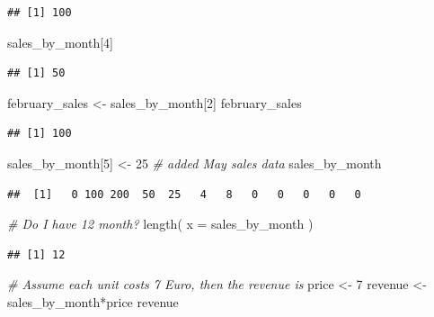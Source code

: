 \documentclass[
  12pt,
  oneside]{book}
\newenvironment{Shaded}{\begin{snugshade}}{\end{snugshade}}
\newcommand{\AttributeTok}[1]{\textcolor[rgb]{0.77,0.63,0.00}{#1}}
\newcommand{\CommentTok}[1]{\textcolor[rgb]{0.56,0.35,0.01}{\textit{#1}}}
\newcommand{\DecValTok}[1]{\textcolor[rgb]{0.00,0.00,0.81}{#1}}
\newcommand{\FunctionTok}[1]{\textcolor[rgb]{0.00,0.00,0.00}{#1}}
\newcommand{\NormalTok}[1]{#1}
\newcommand{\OtherTok}[1]{\textcolor[rgb]{0.56,0.35,0.01}{#1}}
\newcommand{\SpecialCharTok}[1]{\textcolor[rgb]{0.00,0.00,0.00}{#1}}
\begin{document}
\begin{verbatim}
## [1] 100
\end{verbatim}

\begin{Shaded}
\begin{Highlighting}[]
\NormalTok{sales\_by\_month[}\DecValTok{4}\NormalTok{]}
\end{Highlighting}
\end{Shaded}

\begin{verbatim}
## [1] 50
\end{verbatim}

\begin{Shaded}
\begin{Highlighting}[]
\NormalTok{february\_sales }\OtherTok{\textless{}{-}}\NormalTok{ sales\_by\_month[}\DecValTok{2}\NormalTok{]}
\NormalTok{february\_sales}
\end{Highlighting}
\end{Shaded}

\begin{verbatim}
## [1] 100
\end{verbatim}

\begin{Shaded}
\begin{Highlighting}[]
\NormalTok{sales\_by\_month[}\DecValTok{5}\NormalTok{] }\OtherTok{\textless{}{-}} \DecValTok{25} \CommentTok{\# added May sales data}
\NormalTok{sales\_by\_month}
\end{Highlighting}
\end{Shaded}

\begin{verbatim}
##  [1]   0 100 200  50  25   4   8   0   0   0   0   0
\end{verbatim}

\begin{Shaded}
\begin{Highlighting}[]
\CommentTok{\# Do I have 12 month?}
\FunctionTok{length}\NormalTok{( }\AttributeTok{x =}\NormalTok{ sales\_by\_month )}
\end{Highlighting}
\end{Shaded}

\begin{verbatim}
## [1] 12
\end{verbatim}

\begin{Shaded}
\begin{Highlighting}[]
\CommentTok{\# Assume each unit costs 7 Euro, then the revenue is}
\NormalTok{price }\OtherTok{\textless{}{-}} \DecValTok{7}
\NormalTok{revenue }\OtherTok{\textless{}{-}}\NormalTok{ sales\_by\_month}\SpecialCharTok{*}\NormalTok{price}
\NormalTok{revenue}
\end{Highlighting}
\end{Shaded}
\end{document}
